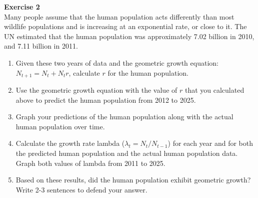 \documentclass[12pt]{article}\usepackage[]{graphicx}\usepackage[]{xcolor}
\begin{document}








{\bf Exercise 2 \\}
Many people assume that the human population acts differently than
most wildlife populations and is increasing at an exponential rate, or
close to it. The UN estimated that the human population was
approximately 7.02 billion in 2010, and 7.11 billion in 2011.


\begin{enumerate}
  \item Given these two years of data and the geometric growth equation:
    $N_{t+1} = N_t + N_t r$, calculate $r$ for the human population. 
  \item Use the geometric growth equation with the value of $r$ that
    you calculated above to predict the human population from 2012 to
    2025. 
  \item Graph your predictions of the human population along with the
    actual human population over time.
  \item Calculate the growth rate lambda ($\lambda_t = N_t / N_{t-1}$)
    for each year and for both the predicted human population and the
    actual human population data. Graph both values of lambda from
    2011 to 2025.
  \item Based on these results, did the human population exhibit
    geometric growth? Write 2-3 sentences to defend your answer. 
\end{enumerate}
\end{document}

